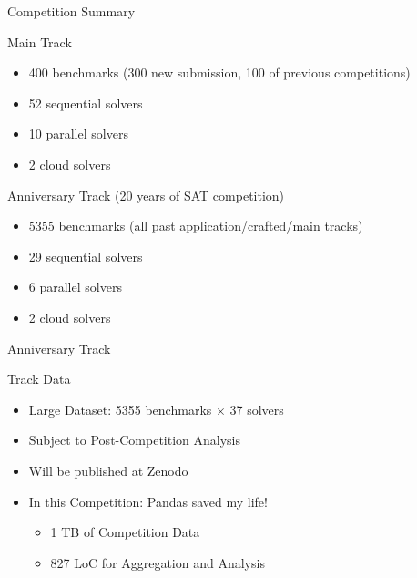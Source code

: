 \documentclass{beamer}
\begin{document}
\begin{frame}{Competition Summary}
\begin{block}{Main Track}
\begin{itemize}
  \item 400 benchmarks (300 new submission, 100 of previous competitions)
  \item 52 sequential solvers
  \item 10 parallel solvers
  \item 2 cloud solvers
\end{itemize}
\end{block}

\begin{block}{Anniversary Track (20 years of SAT competition)}
\begin{itemize}
  \item 5355 benchmarks (all past application/crafted/main tracks)
  \item 29 sequential solvers
  \item 6 parallel solvers
  \item 2 cloud solvers
\end{itemize}
\end{block}
\end{frame}


\begin{frame}{Anniversary Track}
\begin{block}{Track Data}
\begin{itemize}\setlength\itemsep{1em}
\item Large Dataset: 5355 benchmarks $\times$ 37 solvers
\item Subject to Post-Competition Analysis
\item Will be published at Zenodo
\item In this Competition: Pandas saved my life!
\begin{itemize}\setlength\itemsep{.5em}
\item 1 TB of Competition Data 
\item 827 LoC for Aggregation and Analysis
\end{itemize}
\end{itemize}
\end{block}
\end{frame}
\end{document}
